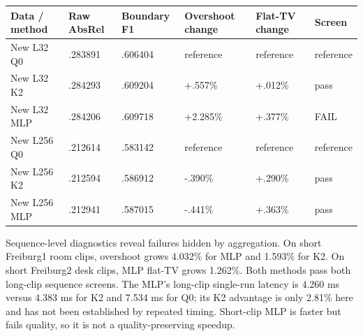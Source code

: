 \documentclass[
  10pt,
]{article}
\begin{document}
\begin{longtable}[]{@{}
  >{\raggedright\arraybackslash}p{}
  >{\raggedleft\arraybackslash}p{}
  >{\raggedleft\arraybackslash}p{}
  >{\raggedleft\arraybackslash}p{}
  >{\raggedleft\arraybackslash}p{}
  >{\raggedright\arraybackslash}p{}@{}}
\toprule\noalign{}
\begin{minipage}[b]{\linewidth}\raggedright
Data / method
\end{minipage} & \begin{minipage}[b]{\linewidth}\raggedleft
Raw AbsRel
\end{minipage} & \begin{minipage}[b]{\linewidth}\raggedleft
Boundary F1
\end{minipage} & \begin{minipage}[b]{\linewidth}\raggedleft
Overshoot change
\end{minipage} & \begin{minipage}[b]{\linewidth}\raggedleft
Flat-TV change
\end{minipage} & \begin{minipage}[b]{\linewidth}\raggedright
Screen
\end{minipage} \\
\midrule\noalign{}
\endhead
\bottomrule\noalign{}
\endlastfoot
New L32 Q0 & .283891 & .606404 & reference & reference & reference \\
New L32 K2 & .284293 & .609204 & +.557\% & +.012\% & pass \\
New L32 MLP & .284206 & .609718 & +2.285\% & +.377\% & FAIL \\
New L256 Q0 & .212614 & .583142 & reference & reference & reference \\
New L256 K2 & .212594 & .586912 & -.390\% & +.290\% & pass \\
New L256 MLP & .212941 & .587015 & -.441\% & +.363\% & pass \\
\end{longtable}

Sequence-level diagnostics reveal failures hidden by aggregation. On
short Freiburg1 room clips, overshoot grows 4.032\% for MLP and 1.593\%
for K2. On short Freiburg2 desk clips, MLP flat-TV grows 1.262\%. Both
methods pass both long-clip sequence screens. The MLP's long-clip
single-run latency is 4.260 ms versus 4.383 ms for K2 and 7.534 ms for
Q0; its K2 advantage is only 2.81\% here and has not been established by
repeated timing. Short-clip MLP is faster but fails quality, so it is
not a quality-preserving speedup.
\end{document}
